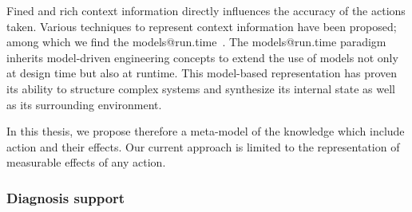 Fined and rich context information directly influences the accuracy of the actions taken.
Various techniques to represent context information have been proposed; among which we find the models@run.time~\cite{DBLP:journals/computer/MorinBJFS09, DBLP:journals/computer/BlairBF09}.
The models@run.time paradigm inherits model-driven engineering concepts to extend the use of models not only at design time but also at runtime. 
This model-based representation has proven its ability to structure complex systems and synthesize its internal state as well as its surrounding environment.

In this thesis, we propose therefore a meta-model of the knowledge which include action and their effects.
Our current approach is limited to the representation of measurable effects of any action.


\subsubsection{Diagnosis support}

